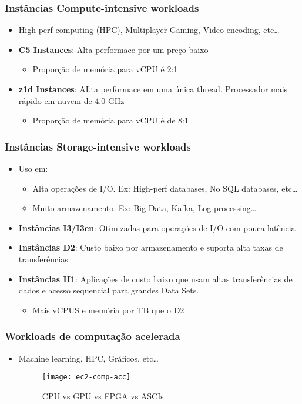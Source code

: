 \begin{frame}
	\frametitle{Instâncias Compute-intensive workloads}
	\begin{itemize}
		\item High-perf computing (HPC), Multiplayer Gaming, Video encoding, etc\dots
		\item \textbf{C5 Instances}: Alta performace por um preço baixo
			\begin{itemize}
				\item Proporção de memória para vCPU é 2:1
			\end{itemize}
		\item \textbf{z1d Instances}: ALta performace em uma única thread. Processador mais rápido em nuvem de 4.0 GHz
			\begin{itemize}
				\item Proporção de memória para vCPU é de 8:1
			\end{itemize}
	\end{itemize}
\end{frame}

\begin{frame}
	\frametitle{Instâncias Storage-intensive workloads}
	\begin{itemize}
		\item Uso em:
			\begin{itemize}
				\item Alta operações de I/O. Ex: High-perf databases, No SQL databases, etc\dots
				\item Muito armazenamento. Ex: Big Data, Kafka, Log processing\dots
			\end{itemize}
		\item \textbf{Instâncias I3/I3en}: Otimizadas para operações de I/O com pouca latência
		\item \textbf{Instâncias D2}: Custo baixo por armazenamento e suporta alta taxas de transferências
		\item \textbf{Instâncias H1}: Aplicações de custo baixo que usam altas transferências de dados e acesso sequencial para grandes Data Sets.
			\begin{itemize}
				\item Mais vCPUS e memória por TB que o D2
			\end{itemize}
	\end{itemize}
\end{frame}

\begin{frame}
	\frametitle{Workloads de computação acelerada}
	\begin{itemize}
		\item Machine learning, HPC, Gráficos, etc\dots
		\hfill
			\begin{figure}[htpb]
				\centering
				\texttt{[image: ec2-comp-acc]}
				\caption{CPU vs GPU vs FPGA vs ASCIs\cite{CDOLR}}
			\end{figure}
	\end{itemize}
\end{frame}

